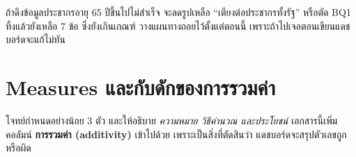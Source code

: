 \documentclass[11pt,a4paper]{article}
\begin{document}
\begin{warnbox}[title={BQ1 เป็นข้อเดียวที่พึ่งข้อมูลนอก CMS}]
ถ้าดึงข้อมูลประชากรอายุ 65 ปีขึ้นไปไม่สำเร็จ จะลดรูปเหลือ ``เตียงต่อประชากรทั้งรัฐ''
หรือตัด BQ1 ทิ้งแล้วยังเหลือ 7 ข้อ ซึ่งยังเกินเกณฑ์ วางแผนทางถอยไว้ตั้งแต่ตอนนี้
เพราะถ้าไปเจอตอนเขียนแดชบอร์ดจะแก้ไม่ทัน
\end{warnbox}

\section{Measures และกับดักของการรวมค่า}

โจทย์กำหนดอย่างน้อย 3 ตัว และให้อธิบาย \emph{ความหมาย วิธีคำนวณ และประโยชน์}
เอกสารนี้เพิ่มคอลัมน์ \textbf{การรวมค่า (additivity)} เข้าไปด้วย เพราะเป็นสิ่งที่ตัดสินว่า
แดชบอร์ดจะสรุปตัวเลขถูกหรือผิด
\end{document}
